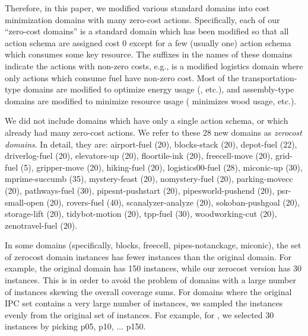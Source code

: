 Therefore, in this paper, we modified various standard domains
into cost minimization domains with many zero-cost actions.
Specifically, each of our ``zero-cost domains'' is a standard domain which has been modified so that all action schema are assigned
cost 0 except for a few (usually one) action schema which consumes some key resource.
The suffixes in the names of these domains indicate the actions with non-zero costs, 
e.g.,  is a modified logistics domain where only actions which consume fuel have non-zero cost.
Most of the transportation-type domains are modified to optimize 
energy usage (,  etc.), and  assembly-type domains are modified to minimize resource usage
( minimizes wood usage, etc.).

We did not
include domains which have only a single action schema, or which already had many zero-cost actions.
We refer to these 28 new domains as \emph{zerocost domains}.
In detail, they are:
airport-fuel (20), blocks-stack (20), depot-fuel (22), driverlog-fuel (20),
elevators-up (20), floortile-ink (20), freecell-move (20), grid-fuel (5),
gripper-move (20), hiking-fuel (20), logistics00-fuel (28), miconic-up (30),
mprime-succumb (35), mystery-feast (20), nomystery-fuel (20),
parking-movecc (20), pathways-fuel (30), pipesnt-pushstart (20),
pipesworld-pushend (20), psr-small-open (20), rovers-fuel (40),
scanalyzer-analyze (20), sokoban-pushgoal (20), storage-lift (20),
tidybot-motion (20), tpp-fuel (30), woodworking-cut (20),
zenotravel-fuel (20).

In some domains (specifically, blocks, freecell, pipes-notanckage, miconic), the set of zerocost domain instances has fewer instances than the original domain.%
For example, the original  domain has
150 instances, while our zerocost version has 30 instances.
This is in order to avoid  the problem of domains with a large number of instances  skewing the overall coverage sums.
For domains where the original IPC set contains a very large number of instances, we sampled the instances evenly from the original set
of instances. For example, for , we selected 30
instances by picking p05, p10, ... p150.

